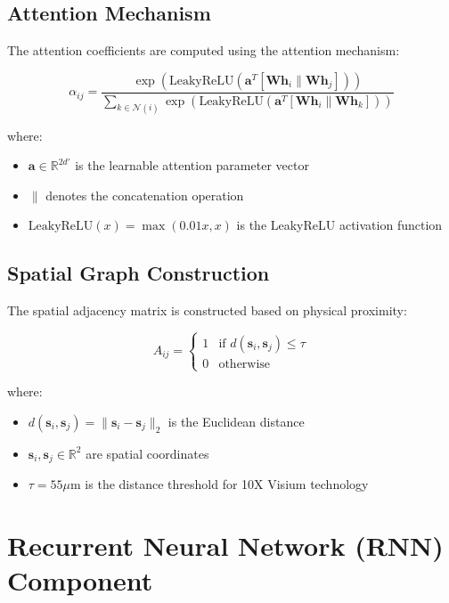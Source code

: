 \documentclass[12pt]{article}
\newcommand{\Real}{\mathbb{R}}
\newcommand{\vecbf}[1]{\mathbf{#1}}
\newcommand{\lrelu}{\text{LeakyReLU}}
\begin{document}
\subsection{Attention Mechanism}

The attention coefficients are computed using the attention mechanism:

\begin{equation}
\alpha_{ij} = \frac{\exp\left(\lrelu\left(\vecbf{a}^T[\vecbf{W}\vecbf{h}_i \| \vecbf{W}\vecbf{h}_j]\right)\right)}{\sum_{k \in \mathcal{N}(i)} \exp\left(\lrelu\left(\vecbf{a}^T[\vecbf{W}\vecbf{h}_i \| \vecbf{W}\vecbf{h}_k]\right)\right)}
\end{equation}

where:
\begin{itemize}
    \item $\vecbf{a} \in \Real^{2d'}$ is the learnable attention parameter vector
    \item $\|$ denotes the concatenation operation
    \item $\lrelu(x) = \max(0.01x, x)$ is the LeakyReLU activation function
\end{itemize}

\subsection{Spatial Graph Construction}

The spatial adjacency matrix is constructed based on physical proximity:

\begin{equation}
A_{ij} = \begin{cases}
1 & \text{if } d(\vecbf{s}_i, \vecbf{s}_j) \leq \tau \\
0 & \text{otherwise}
\end{cases}
\end{equation}

where:
\begin{itemize}
    \item $d(\vecbf{s}_i, \vecbf{s}_j) = \|\vecbf{s}_i - \vecbf{s}_j\|_2$ is the Euclidean distance
    \item $\vecbf{s}_i, \vecbf{s}_j \in \Real^2$ are spatial coordinates
    \item $\tau = 55\mu\text{m}$ is the distance threshold for 10X Visium technology
\end{itemize}

\section{Recurrent Neural Network (RNN) Component}
\end{document}
